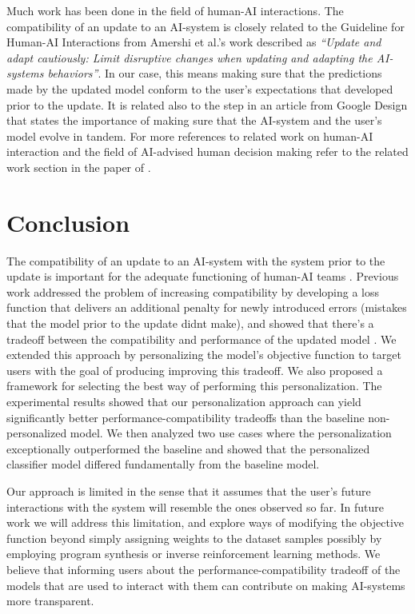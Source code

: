 \documentclass[letterpaper]{article} %
\theoremstyle{definition}
\begin{document}
Much work has been done in the field of human-AI interactions. The compatibility of an update to an AI-system is closely related to the  Guideline for Human-AI Interactions from Amershi et al.'s work \cite{amershi2019guidelines} described as \emph{``Update and adapt cautiously: Limit disruptive changes when updating and adapting the
AI-systems behaviors''}. In our case, this means making sure that the predictions made by the updated model conform to the user's expectations that developed prior to the update. It is related also to the  step in an article from Google Design \cite{lovejoy2017} that states the importance of making sure that the AI-system and the user's model evolve in tandem. For more references to related work on human-AI interaction and the field of AI-advised human decision making refer to the related work section in the paper of \citet{bansal2019updates}.
\vspace{-0.92mm}
\section{Conclusion}
The compatibility of an update to an AI-system with the system prior to the update is important for the adequate functioning of human-AI teams \cite{bansal2019beyond, bansal2019updates}. Previous work addressed the problem of increasing compatibility by developing a loss function that delivers an additional penalty for newly introduced errors (mistakes that the model prior to the update didnt make), and showed that there's a tradeoff between the compatibility and performance of the updated model \cite{bansal2019updates}. We extended this approach by personalizing the model's objective function to target users with the goal of producing improving this tradeoff. We also proposed a framework for selecting the best way of performing this personalization.  The experimental results showed that our personalization approach can yield significantly better performance-compatibility tradeoffs than the baseline non-personalized model.
We then analyzed two use cases where the personalization exceptionally outperformed the baseline and showed that the personalized classifier model differed fundamentally from the baseline model.

Our approach is limited in the sense that it assumes that the user's future interactions with the system will resemble the ones observed so far.
In future work we will address this limitation, and explore ways of modifying the objective function beyond simply assigning weights to the dataset samples possibly by employing program synthesis or inverse reinforcement learning methods. We believe that informing users  about the   performance-compatibility tradeoff  of the models that are used to interact with them can  contribute on making AI-systems more transparent.
\end{document}

